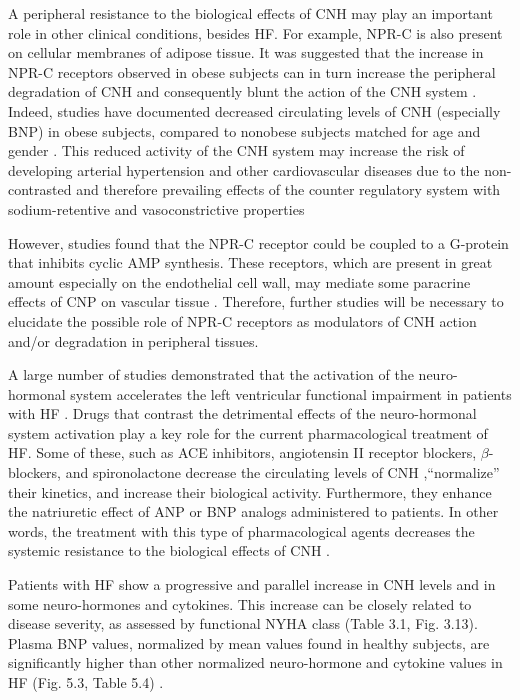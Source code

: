 \documentclass[14pt,a4paper,onecolumn]{extarticle}
\begin{document}
A peripheral resistance to the biological effects of CNH may play an important role in other clinical conditions, besides HF. For example, NPR-C is also present on cellular membranes of adipose tissue. It was suggested that the increase in NPR-C receptors observed in obese subjects can in turn increase the peripheral degradation of CNH and consequently blunt the action of the CNH system \citep{bib351} \citep{bib352}. Indeed, studies have documented decreased circulating levels of CNH (especially BNP) in obese subjects, compared to nonobese subjects matched for age and gender \citep{bib351} \citep{bib354}. This reduced activity of the CNH system may increase the risk of developing arterial hypertension and other cardiovascular diseases due to the non-contrasted and therefore prevailing effects of the counter regulatory system with sodium-retentive and vasoconstrictive properties \citep{bib352} \citep{bib353} \citep{bib354}

However, studies found that the NPR-C receptor could be coupled to a G-protein that inhibits cyclic AMP synthesis. These receptors, which are present in great amount especially on the endothelial cell wall, may mediate some paracrine effects of CNP on vascular tissue \citep{bib355} \citep{bib356} \citep{bib357}. Therefore, further studies will be necessary to elucidate the possible role of NPR-C receptors as modulators of CNH action and/or degradation in peripheral tissues.

A large number of studies demonstrated that the activation of the neuro-hormonal system accelerates the left ventricular functional impairment in patients with HF \citep{bib31} \citep{bib32} \citep{bib33} \citep{bib34} \citep{bib35} \citep{bib36} \citep{bib358} \citep{bib359} \citep{bib360}. Drugs that contrast the detrimental effects of the neuro-hormonal system activation play a key role for the current pharmacological treatment of HF. Some of these, such as ACE inhibitors, angiotensin II receptor blockers, $\beta$-blockers, and spironolactone decrease the circulating levels of CNH \citep{bib35} \citep{bib361} \citep{bib362} \citep{bib363} \citep{bib364} \citep{bib365},“normalize” their kinetics, and increase their biological activity. Furthermore, they enhance the natriuretic effect of ANP or BNP analogs administered to patients. In other words, the treatment with this type of pharmacological agents decreases the systemic resistance to the biological effects of CNH \citep{bib327} \citep{bib333}.

Patients with HF show a progressive and parallel increase in CNH levels and in some neuro-hormones and cytokines. This increase can be closely related to disease severity, as assessed by functional NYHA class (Table 3.1, Fig. 3.13). Plasma BNP values, normalized by mean values found in healthy subjects, are significantly higher than other normalized neuro-hormone and cytokine values in HF (Fig. 5.3, Table 5.4) \citep{bib360}.
\end{document}
